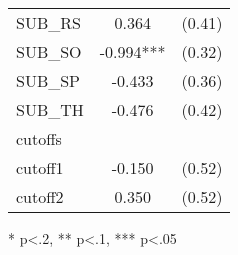\begin{table}[H]
\begin{threeparttable}
\begin{tabular}{l c c}
      SUB\_RS                               & 0.364                  & (0.41)               \\
      SUB\_SO                               & -0.994***              & (0.32)               \\
      SUB\_SP                               & -0.433                 & (0.36)               \\
      SUB\_TH                               & -0.476                 & (0.42)               \\
      \hline
      cutoffs                               &                        &                      \\
      cutoff1                               & -0.150                 & (0.52)               \\
      cutoff2                               & 0.350                  & (0.52)               \\
      \hline
      \hline
    \end{tabular}
    \begin{tablenotes}
    \item{* p<.2, ** p<.1, *** p<.05}
    \end{tablenotes}
  \end{threeparttable}
\end{table}

\clearpage{}

\newpage{}

